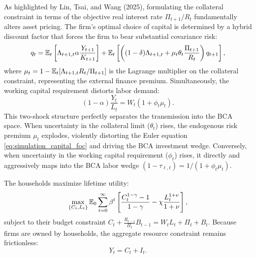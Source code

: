 As highlighted by Lin, Tsai, and Wang (2025), formulating the collateral constraint
in terms of the objective real interest rate \(\Pi_{t+1}/R_t\) fundamentally alters
asset pricing. The firm's optimal choice of capital is determined by a hybrid
discount factor that forces the firm to bear substantial covariance risk:
\begin{equation}
    q_t = \mathbb{E}_t \left[ \Lambda_{t+1,t} \alpha \frac{Y_{t+1}}{K_{t+1}} \right]
    + \mathbb{E}_t \left[ \left( (1-\delta)\Lambda_{t+1,t} + \mu_t \theta_t \frac{\Pi_{t+1}}{R_t} \right) q_{t+1} \right],
    \label{eq:simulation_capital_foc}
\end{equation}
where \(\mu_t = 1 - \mathbb{E}_t[\Lambda_{t+1,t} R_t / \Pi_{t+1}]\) is the Lagrange multiplier on
the collateral constraint, representing the external finance premium. Simultaneously,
the working capital requirement distorts labor demand:
\begin{equation}
    (1-\alpha)\frac{Y_t}{L_t} = W_t (1 + \phi_t \mu_t).
    \label{eq:simulation_labor_foc}
\end{equation}
This two-shock structure perfectly separates the transmission into the BCA space.
When uncertainty in the collateral limit (\(\theta_t\)) rises, the endogenous risk
premium \(\mu_t\) explodes, violently distorting the Euler equation \eqref{eq:simulation_capital_foc}
and driving the BCA investment wedge. Conversely, when uncertainty in the working
capital requirement (\(\phi_t\)) rises, it directly and aggressively maps into the
BCA labor wedge \((1-\tau_{\ell,t}) = 1/(1+\phi_t\mu_t)\).

The households maximize lifetime utility:
\begin{equation}
    \max_{\{C_t, L_t\}} \mathbb{E}_0 \sum_{t=0}^{\infty} \beta^t
    \left[ \frac{C_t^{1-\gamma}-1}{1-\gamma} - \chi\frac{L_t^{1+\nu}}{1+\nu} \right],
    \label{eq:simulation_ra_problem}
\end{equation}
subject to their budget constraint \(C_t + \frac{R_{t-1}}{\Pi_t}B_{t-1} = W_t L_t + \Pi_t + B_t\).
Because firms are owned by households, the aggregate resource constraint remains frictionless:
\begin{equation}
    Y_t = C_t + I_t.
    \label{eq:simulation_resource}
\end{equation}

